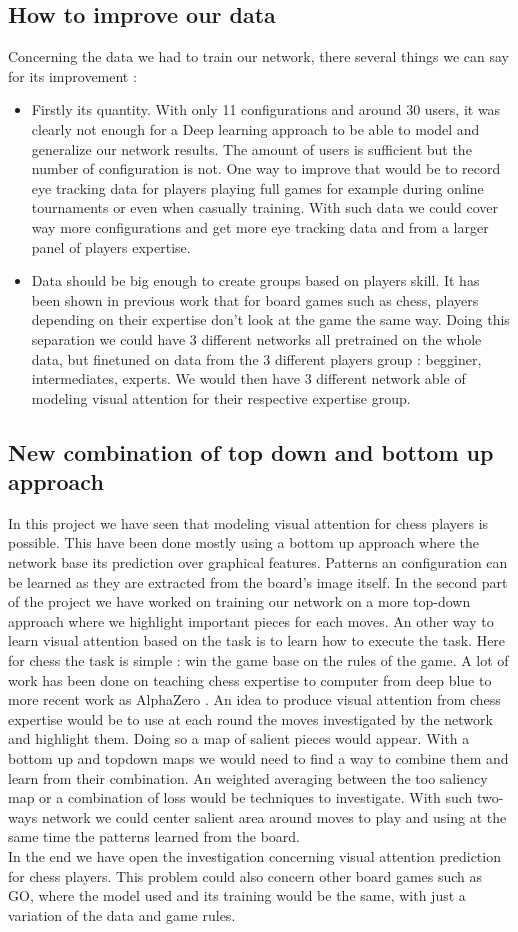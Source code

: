 \subsection{How to improve our data}

Concerning the data we had to train our network, there several things we can say for its improvement :
\begin{itemize}
    \item Firstly its quantity. With only 11 configurations and around 30 users, it was clearly not enough for a Deep learning approach to be able to model and generalize our network results. The amount of users is sufficient but the number of configuration is not. One way to improve that would be to record eye tracking data for players playing full games for example during online tournaments  or even when casually training. With such data we could cover way more configurations and get more eye tracking data and from a larger panel of players expertise.
    \item Data should be big enough to create groups based on players skill. It has been shown in previous work that for board games such as chess, players depending on their expertise don't look at the game the same way. Doing this separation we could have 3 different networks all pretrained on the whole data, but finetuned on data from the 3 different players group : begginer, intermediates, experts. We would then have 3 different network able of modeling visual attention for their respective expertise group.
\end{itemize}

\subsection{New combination of top down and bottom up approach}
In this project we have seen that modeling visual attention for chess players is possible. This have been done mostly using a bottom up approach where the network base its prediction over graphical features. Patterns an configuration can be learned as they are extracted from the board's image itself. 
In the second part of the project we have worked on training our network on a more top-down approach where we highlight important pieces for each moves. 
An other way to learn visual attention based on the task is to learn how to execute the task. Here for chess the task is simple : win the game base on the rules of the game. A lot of work has been done on teaching chess expertise to computer from deep blue \cite{} to more recent work as AlphaZero \cite{}.
An idea to produce visual attention from chess expertise would be to use at each round the moves investigated by the network and highlight them. Doing so a map of salient pieces would appear.
With a bottom up and topdown maps we would need to find a way to combine them and learn from their combination. An weighted averaging between the too saliency map or a combination of loss would be techniques to investigate. With such two-ways network we could center salient area around moves to play and using at the same time the patterns learned from the board.\\

In the end we have open the investigation concerning visual attention prediction for chess players. This problem could also concern other board games such as GO, where the model used and its training would be the same, with just a variation of the data and game rules.




